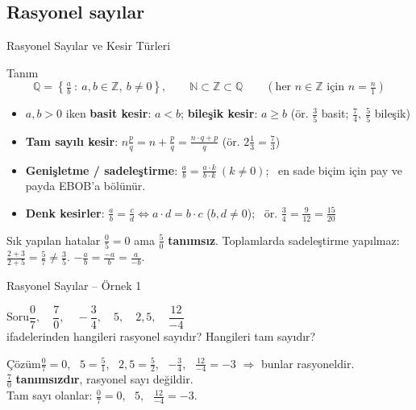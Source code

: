 \documentclass[aspectratio=169,11pt]{beamer}
\newcommand{\soru}[3]{%
\begin{frame}{#1}
  \begin{block}{Soru}\large #2\end{block}
  \pause
  \begin{exampleblock}{Çözüm}\large #3\end{exampleblock}
\end{frame}}
\begin{document}
\subsection{Rasyonel sayılar}
\begin{frame}{Rasyonel Sayılar ve Kesir Türleri}
\begin{block}{Tanım}
\small
\[\mathbb{Q}=\left\{\tfrac{a}{b}\ :\ a,b\in\mathbb{Z},\ b\neq 0\right\},\qquad \mathbb{N}\subset\mathbb{Z}\subset\mathbb{Q}\qquad(\text{her } n\in\mathbb{Z} \text{ için } n=\tfrac{n}{1})\]
\vspace{-10pt}
\begin{itemize}\setlength{\itemsep}{1pt}
\item \(a,b>0\) iken \textbf{basit kesir}: \(a<b\); \quad \textbf{bileşik kesir}: \(a\ge b\) \quad (ör. \(\frac{3}{5}\) basit; \(\frac{7}{4},\ \frac{5}{5}\) bileşik)
\item \textbf{Tam sayılı kesir}: \(\displaystyle n\tfrac{p}{q}=n+\frac{p}{q}=\frac{n\cdot q+p}{q}\) \quad (ör. \(2\frac{1}{3}=\frac{7}{3}\))
\item \textbf{Genişletme / sadeleştirme}: \(\frac{a}{b}=\frac{a\cdot k}{b\cdot k}\ (k\neq 0)\); \ en sade biçim için pay ve payda EBOB'a bölünür.
\item \textbf{Denk kesirler}: \(\frac{a}{b}=\frac{c}{d}\iff a\cdot d=b\cdot c\) \quad (\(b,d\neq 0\)); \ ör. \(\frac{3}{4}=\frac{9}{12}=\frac{15}{20}\)
\end{itemize}
\end{block}
\begin{alertblock}{Sık yapılan hatalar}
\small\(\frac{0}{5}=0\) ama \(\frac{5}{0}\) \textbf{tanımsız}. \quad Toplamlarda sadeleştirme yapılmaz: \(\frac{2+3}{2+5}=\frac{5}{7}\neq\frac{3}{5}\). \quad \(-\frac{a}{b}=\frac{-a}{b}=\frac{a}{-b}\).
\end{alertblock}
\end{frame}

\soru{Rasyonel Sayılar -- Örnek 1}
{\(\dfrac{0}{7},\quad \dfrac{7}{0},\quad -\dfrac{3}{4},\quad 5,\quad 2{,}5,\quad \dfrac{12}{-4}\) \\[4pt] ifadelerinden hangileri rasyonel sayıdır? Hangileri tam sayıdır?}
{\(\frac{0}{7}=0\), \ \(5=\frac{5}{1}\), \ \(2{,}5=\frac{5}{2}\), \ \(-\frac{3}{4}\), \ \(\frac{12}{-4}=-3\) \quad \(\Rightarrow\) bunlar rasyoneldir.\\
\(\frac{7}{0}\) \textbf{tanımsızdır}, rasyonel sayı değildir.\\[4pt]
Tam sayı olanlar: \(\frac{0}{7}=0\), \ \(5\), \ \(\frac{12}{-4}=-3\).}
\end{document}
